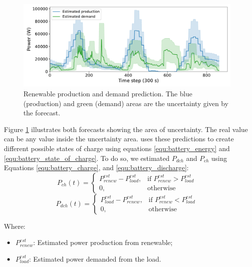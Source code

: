 \begin{figure}[!htb]
    \centering
    \includegraphics[scale=0.5]{Images/Heuristic/predictions.pdf}
    \caption{Renewable production and demand prediction. The blue (production) and green (demand) areas are the uncertainty given by the forecast.}
    \label{fig:predictions}
\end{figure}

Figure \ref{fig:predictions} illustrates both forecasts showing the area of uncertainty. The real value can be any value inside the uncertainty area. \emph{\systemName} uses these predictions to create different possible states of charge using equations \ref{equ:battery_energy} and \ref{equ:battery_state_of_charge}. To do so, we estimated $P_{dch}$ and $P_{ch}$ using Equations \ref{equ:battery_charge}, and \ref{equ:battery_discharge}: 
\begin{equation}
    \label{equ:battery_charge}
    P_{ch}(t) = 
    \begin{cases}
        P_{renew}^{est} - P_{load}^{est},& \text{if } P_{renew}^{est} > P_{load}^{est} \\
        0,              & \text{otherwise}
    \end{cases}
\end{equation}
\begin{equation}
    \label{equ:battery_discharge}
    P_{dch}(t) = 
    \begin{cases}
        P_{load}^{est} - P_{renew}^{est},& \text{if } P_{renew}^{est} < P_{load}^{est} \\
        0,              & \text{otherwise}
    \end{cases}
\end{equation}

Where:
\begin{itemize}
    \item \(P_{renew}^{est}\): Estimated power production from renewable;
    \item \(P_{load}^{est}\): Estimated power demanded from the load.
\end{itemize}

